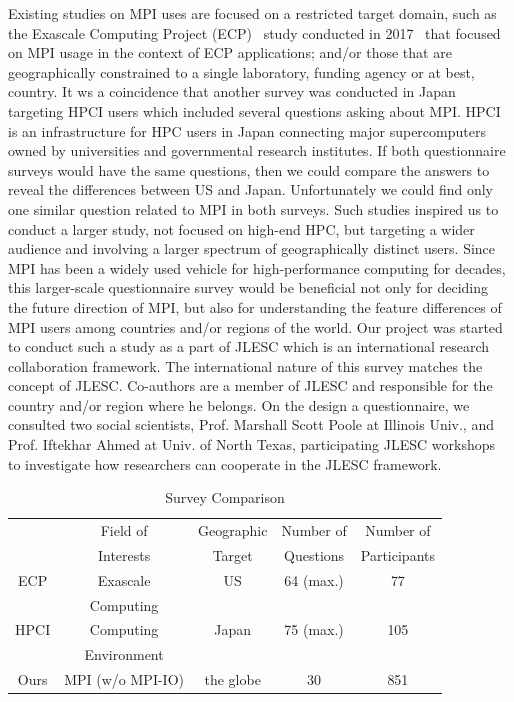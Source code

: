 \documentclass[conference,10pt,letterpaper]{IEEEtran}
\begin{document}
Existing studies on MPI uses are focused on a restricted target domain,
such as the Exascale Computing Project (ECP)~\cite{ECP} study
conducted in 2017~\cite{osti_1462877} that focused 
on MPI usage in the context of ECP applications; and/or those that are
geographically constrained to a single laboratory, funding agency or
at best, country. It ws a coincidence
that another survey was conducted in Japan targeting HPCI\cite{HPCI}
users which included several questions asking about
MPI\cite{hpci-user-survey}.  HPCI is an infrastructure for HPC users
in Japan connecting major supercomputers owned by universities and
governmental research institutes. If both questionnaire surveys would
have the same questions, then we could compare the answers to reveal
the differences between US and Japan. Unfortunately we could find only
one similar question related to MPI in both surveys.
%
Such studies inspired us to conduct a larger study, not focused on
high-end HPC, but targeting a wider audience and involving a larger
spectrum of geographically distinct users. Since MPI has been a widely
used vehicle for high-performance computing for decades, this
larger-scale questionnaire survey would be beneficial not only for
deciding the future direction of MPI, but also for understanding the
feature differences of MPI users among countries and/or regions of the
world.
%
Our project was started to conduct such a study as a part of
JLESC\cite{JLESC} which is an international research collaboration
framework. The international nature of this survey matches the concept
of JLESC. Co-authors are a member of JLESC and responsible for the
country and/or region where he belongs. On the design a questionnaire,
we consulted two social scientists, Prof. Marshall Scott Poole at
Illinois Univ., and Prof. Iftekhar Ahmed at Univ. of North Texas,
participating JLESC workshops to investigate how researchers can
cooperate in the JLESC framework. 
%
\begin{table}[htb]%
\begin{center}%
\caption{Survey Comparison}\label{tab:comparison}%
\begin{tabular}{c|cccc}%
\hline%
 & Field of  & Geographic & Number of & Number of \\%
 & Interests & Target     & Questions & Participants \\%
\hline%
\hline%
ECP  & Exascale & US & 64 (max.) & 77 \\%
& Computing & & & \\%
\hline%
HPCI & Computing & Japan & 75 (max.) & 105 \\%
& Environment & & & \\%
\hline%
Ours & MPI (w/o MPI-IO) & the globe & 30 & 851 \\%
\hline%
\end{tabular}%
\end{center}%
\end{table}%
\end{document}
